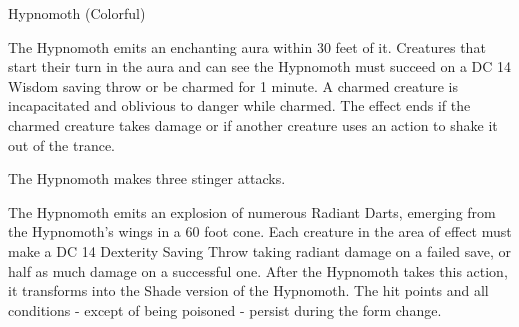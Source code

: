 \vfill\eject\vspace*{-5.6em}
\begin{DndMonster}[width=0.5\textwidth]{Hypnomoth (Colorful)}
	
	\DndMonsterBasics[
		armor-class = {13 (natural armor)},
		hit-points  = {\DndDice{8d10 + 16}},
		speed       = {20 ft., fly 60 ft.},
	]
	
	\DndMonsterAbilityScores[
		str = 12,
		dex = 16,
		con = 14,
		int = 6,
		wis = 14,
		cha = 10,
	]
	
	\DndMonsterDetails[
		skills = {Perception +4},
		senses = {Darkvision 60 ft., passive Perception 14},
		languages = {Understands Sylvan but can't speak},
		challenge =5,
	]
	
	The Hypnomoth emits an enchanting aura within 30 feet of it. Creatures that start their turn in the aura and can see the Hypnomoth must succeed on a DC 14 Wisdom saving throw or be charmed for 1 minute. A charmed creature is incapacitated and oblivious to danger while charmed. The effect ends if the charmed creature takes damage or if another creature uses an action to shake it out of the trance.
	
	The Hypnomoth makes three stinger attacks.   
	
	\DndMonsterAttack[
		name=Stinger,
		distance=melee, %
		mod=+5,
		reach=5,
		targets=one target,
		dmg={\DndDice{1d8 + 3}},
		dmg-type=piercing,
		plus-dmg={\DndDice{2d6}},
		plus-dmg-type=poison,
	]
	
	\DndMonsterAttack[
		name=Radiant Dart,
		distance=melee, %
		mod=+5,
		reach=120,
		targets=one target,
		dmg={\DndDice{1d12 + 3}},
		dmg-type=radiant,
	]
	
	The Hypnomoth emits an explosion of numerous Radiant Darts, emerging from the Hypnomoth's wings in a 60 foot cone. Each creature in the area of effect must make a DC 14 Dexterity Saving Throw taking  radiant damage on a failed save, or half as much damage on a successful one.  After the Hypnomoth takes this action, it transforms into the Shade version of the Hypnomoth. The hit points and all conditions - except of being poisoned - persist during the form change.
\end{DndMonster}

